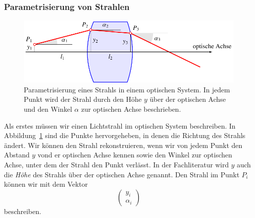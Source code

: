 \subsubsection{Parametrisierung von Strahlen}
\begin{figure}
\centering
\includegraphics{applications/matrixoptik/ray.pdf}
\caption{Parametrisierung eines Strahls in einem optischen System.
In jedem Punkt wird der Strahl durch den Höhe $y$ über der optischen
Achse und den Winkel $\alpha$ zur optischen Achse beschrieben.
\label{mo:ray}}
\end{figure}
Als erstes müssen wir einen Lichtstrahl im optischen System beschreiben.
In Abbildung~\ref{mo:ray} sind die Punkte hervorgeheben, in denen
die Richtung des Strahls ändert.
Wir können den Strahl rekonstruieren, wenn wir von jedem Punkt den
Abstand $y$ vond er optischen Achse kennen sowie den Winkel zur
optischen Achse, unter dem der Strahl den Punkt verlässt.
In der Fachliteratur wird $y$ auch die {\em Höhe} des Strahls über
der optischen Achse genannt.
Den Strahl im Punkt $P_i$ können wir mit dem Vektor
\[
\begin{pmatrix}
y_i\\\alpha_i
\end{pmatrix}
\]
beschreiben.


